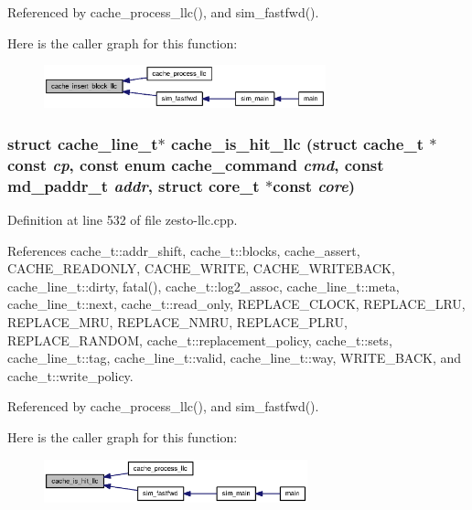 Referenced by cache\_\-process\_\-llc(), and sim\_\-fastfwd().

Here is the caller graph for this function:\nopagebreak
\begin{figure}[H]
\begin{center}
\leavevmode
\includegraphics[width=231pt]{zesto-llc_8cpp_e7c14fa8601433a16fa1cd5f91e64c7c_icgraph}
\end{center}
\end{figure}
\subsubsection[{cache\_\-is\_\-hit\_\-llc}]{\setlength{\rightskip}{0pt plus 5cm}struct {\bf cache\_\-line\_\-t}$\ast$ cache\_\-is\_\-hit\_\-llc (struct {\bf cache\_\-t} $\ast$const  {\em cp}, \/  const enum {\bf cache\_\-command} {\em cmd}, \/  const {\bf md\_\-paddr\_\-t} {\em addr}, \/  struct {\bf core\_\-t} $\ast$const  {\em core})\hspace{0.3cm}{\tt  [read]}}\label{zesto-llc_8cpp_4c8a74cb2e996679500e5a9adb9efb5c}




Definition at line 532 of file zesto-llc.cpp.

References cache\_\-t::addr\_\-shift, cache\_\-t::blocks, cache\_\-assert, CACHE\_\-READONLY, CACHE\_\-WRITE, CACHE\_\-WRITEBACK, cache\_\-line\_\-t::dirty, fatal(), cache\_\-t::log2\_\-assoc, cache\_\-line\_\-t::meta, cache\_\-line\_\-t::next, cache\_\-t::read\_\-only, REPLACE\_\-CLOCK, REPLACE\_\-LRU, REPLACE\_\-MRU, REPLACE\_\-NMRU, REPLACE\_\-PLRU, REPLACE\_\-RANDOM, cache\_\-t::replacement\_\-policy, cache\_\-t::sets, cache\_\-line\_\-t::tag, cache\_\-line\_\-t::valid, cache\_\-line\_\-t::way, WRITE\_\-BACK, and cache\_\-t::write\_\-policy.

Referenced by cache\_\-process\_\-llc(), and sim\_\-fastfwd().

Here is the caller graph for this function:\nopagebreak
\begin{figure}[H]
\begin{center}
\leavevmode
\includegraphics[width=216pt]{zesto-llc_8cpp_4c8a74cb2e996679500e5a9adb9efb5c_icgraph}
\end{center}
\end{figure}

